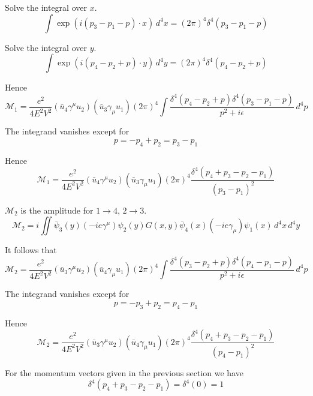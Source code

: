 Solve the integral over $x$.
\begin{equation*}
\int\exp(i(p_3-p_1-p)\cdot x)\,d^4x=(2\pi)^4\delta^4(p_3-p_1-p)
\end{equation*}

Solve the integral over $y$.
\begin{equation*}
\int\exp(i(p_4-p_2+p)\cdot y)\,d^4y=(2\pi)^4\delta^4(p_4-p_2+p)
\end{equation*}

Hence
\begin{equation*}
\mathcal M_1=\frac{e^2}{4E^2V^2}(\bar u_4\gamma^\mu u_2)(\bar u_3\gamma_\mu u_1)
(2\pi)^4\int
\frac{\delta^4(p_4-p_2+p)\delta^4(p_3-p_1-p)}{p^2+i\epsilon}
\,d^4p
\end{equation*}

The integrand vanishes except for
\begin{equation*}
p=-p_4+p_2=p_3-p_1
\end{equation*}

Hence
\begin{equation*}
\mathcal M_1=\frac{e^2}{4E^2V^2}(\bar u_4\gamma^\mu u_2)(\bar u_3\gamma_\mu u_1)
(2\pi)^4\frac{\delta^4(p_4+p_3-p_2-p_1)}{(p_3-p_1)^2}
\end{equation*}

$\mathcal M_2$ is the amplitude for $1\rightarrow4$, $2\rightarrow3$.
\begin{equation*}
\mathcal M_2=i\iint
\bar\psi_3(y)(-ie\gamma^\mu)\psi_2(y)
G(x,y)
\bar\psi_4(x)(-ie\gamma_\mu)\psi_1(x)
\,d^4x\,d^4y
\end{equation*}

It follows that
\begin{equation*}
\mathcal M_2=\frac{e^2}{4E^2V^2}(\bar u_3\gamma^\mu u_2)(\bar u_4\gamma_\mu u_1)
(2\pi)^4\int
\frac{\delta^4(p_3-p_2+p)\delta^4(p_4-p_1-p)}{p^2+i\epsilon}
\,d^4p
\end{equation*}

The integrand vanishes except for
\begin{equation*}
p=-p_3+p_2=p_4-p_1
\end{equation*}

Hence
\begin{equation*}
\mathcal M_2=\frac{e^2}{4E^2V^2}(\bar u_3\gamma^\mu u_2)(\bar u_4\gamma_\mu u_1)
(2\pi)^4\frac{\delta^4(p_4+p_3-p_2-p_1)}{(p_4-p_1)^2}
\end{equation*}

For the momentum vectors given in the previous section we have
\begin{equation*}
\delta^4(p_4+p_3-p_2-p_1)=\delta^4(0)=1
\end{equation*}

